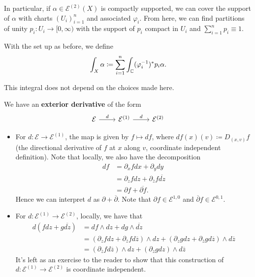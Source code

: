 \documentclass{article}
\begin{document}
{In particular, if $\alpha \in \mathcal{E}^{(2)}(X)$ is compactly supported, we can cover the support of $\alpha$ with charts $(U_i)_{i = 1}^n$ and associated $\varphi_i$. From here, we can find partitions of unity $p_i: U_i \to [0, \infty)$ with the support of $p_i$ compact in $U_i$ and $\sum_{i = 1}^n p_i \equiv 1$.

\begin{definition}
    With the set up as before, we define 
    \[\int_{X} \alpha \coloneqq \sum_{i = 1}^n \int_{\mathbb{C}} (\varphi_i^{-1})^* p_i \alpha.\]
\end{definition}

\begin{exercise}
    This integral does not depend on the choices made here.
\end{exercise}

We have an \textbf{exterior derivative} of the form
\[\begin{tikzcd}
	{\mathcal{E}} & {\mathcal{E}^{(1)}} & {\mathcal{E}^{(2)}}
	\arrow["d", from=1-1, to=1-2]
	\arrow["d", from=1-2, to=1-3]
\end{tikzcd}\]
\begin{itemize}
    \item For $d: \mathcal{E} \to \mathcal{E}^{(1)}$, the map is given by $f \mapsto df$, where $df(x)(v) \coloneqq D_{(x, v)} f$ (the directional derivative of $f$ at $x$ along $v$, coordinate independent definition). Note that locally, we also have the decomposition
    \begin{align*}
        df &= \partial_x f dx + \partial_y dy\\
        &= \partial_{z} f dz + \partial_{\overline{z}} f \overline{dz}\\
        &= \partial f + \overline{\partial f}.
    \end{align*}
    Hence we can interpret $d$ as $\partial + \overline{\partial}$. Note that $\partial f \in \mathcal{E}^{1, 0}$ and $\overline{\partial} f \in \mathcal{E}^{0, 1}$.
    \item For $d: \mathcal{E}^{(1)} \to \mathcal{E}^{(2)}$, locally, we have that
    \begin{align*}
        d(fdz + g \overline{dz}) &= df \wedge dz + dg \wedge \overline{dz}\\
        &= (\partial_z f dz  + \partial_{\overline{z}} f d\overline{z}) \wedge dz + (\partial_z g dz  + \partial_{\overline{z}} g d\overline{z}) \wedge d\overline{z}\\
        &= (\partial_{\overline{z}} f d\overline{z}) \wedge dz + (\partial_z g dz) \wedge d\overline{z} \tag*{Anti-Symmetry}
    \end{align*}
    It's left as an exercise to the reader to show that this construction of $d: \mathcal{E}^{(1)} \to \mathcal{E}^{(2)}$ is coordinate independent.
\end{itemize}

}
\end{document}
